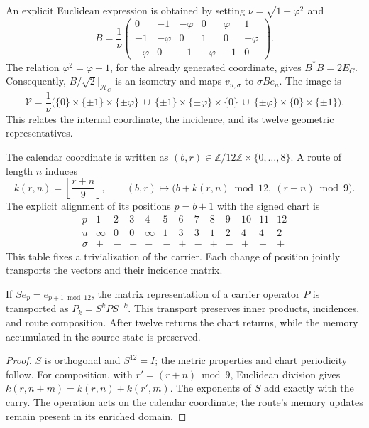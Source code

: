 An explicit Euclidean expression is obtained by setting
\(\nu=\sqrt{1+\varphi^2}\) and
\[
 B=\frac1\nu
 \begin{pmatrix}
 0&-1&-\varphi&0&\varphi&1\\
 -1&-\varphi&0&1&0&-\varphi\\
 -\varphi&0&-1&-\varphi&-1&0
 \end{pmatrix}.
\]
The relation \(\varphi^2=\varphi+1\), for the already generated coordinate,
gives \(B^*B=2E_C\).
Consequently, \(B/\sqrt2|_{\mathcal H_C}\) is an isometry and maps
\(v_{u,\sigma}\) to \(\sigma Be_u\). The image is
\[
 \mathcal V=\frac1\nu\bigl(
 \{0\}\times\{\pm1\}\times\{\pm\varphi\}\ \cup\
 \{\pm1\}\times\{\pm\varphi\}\times\{0\}\ \cup\
 \{\pm\varphi\}\times\{0\}\times\{\pm1\}\bigr).
\]
This relates the internal coordinate, the incidence, and its
twelve geometric representatives.

The calendar coordinate is written as \((b,r)\in
\mathbb Z/12\mathbb Z\times\{0,\ldots,8\}\). A route of length \(n\)
induces
\[
 k(r,n)=\left\lfloor\frac{r+n}{9}\right\rfloor,\qquad
 (b,r)\longmapsto
 \bigl(b+k(r,n)\bmod12,\ (r+n)\bmod9\bigr).
\]
The explicit alignment of its positions \(p=b+1\) with the signed chart is
\[
\begin{array}{c|rrrrrrrrrrrr}
p&1&2&3&4&5&6&7&8&9&10&11&12\\ \hline
u&\infty&0&0&\infty&1&3&3&1&2&4&4&2\\
\sigma&+&-&+&-&-&+&-&+&-&+&-&+
\end{array}
\]
This table fixes a trivialization of the carrier. Each change of position
jointly transports the vectors and their incidence matrix.

\begin{proposition}
If \(S e_p=e_{p+1\bmod12}\), the matrix representation of a
carrier operator \(P\) is transported as \(P_k=S^kPS^{-k}\).
This transport preserves inner products, incidences, and route
composition. After twelve returns the chart returns, while the memory
accumulated in the source state is preserved.
\end{proposition}
\begin{proof}
\(S\) is orthogonal and \(S^{12}=I\); the metric properties
and chart periodicity follow. For composition, with
\(r'=(r+n)\bmod9\), Euclidean division gives
\(k(r,n+m)=k(r,n)+k(r',m)\). The exponents of \(S\) add
exactly with the carry. The operation acts on the calendar
coordinate; the route's memory updates remain
present in its enriched domain.
\end{proof}

